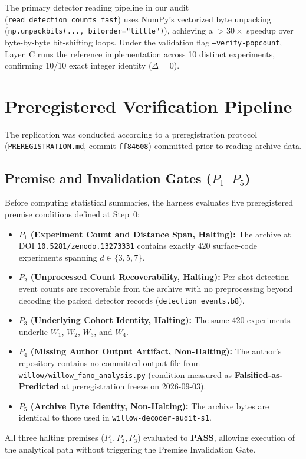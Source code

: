 The primary detector reading pipeline in our audit (\texttt{read\_detection\_counts\_fast}) uses NumPy's vectorized byte unpacking (\texttt{np.unpackbits(..., bitorder="little")}), achieving a $>30\times$ speedup over byte-by-byte bit-shifting loops. Under the validation flag \texttt{--verify-popcount}, Layer~C runs the reference implementation across 10 distinct experiments, confirming 10/10 exact integer identity ($\Delta = 0$).

\section{Preregistered Verification Pipeline}

The replication was conducted according to a preregistration protocol (\texttt{PREREGISTRATION.md}, commit \texttt{ff84608}) committed prior to reading archive data.

\subsection{Premise and Invalidation Gates ($P_1$–$P_5$)}
Before computing statistical summaries, the harness evaluates five preregistered premise conditions defined at Step~0:
\begin{itemize}
    \item \textbf{$P_1$ (Experiment Count and Distance Span, Halting):} The archive at DOI \texttt{10.5281/zenodo.13273331} contains exactly 420 surface-code experiments spanning $d \in \{3, 5, 7\}$.
    \item \textbf{$P_2$ (Unprocessed Count Recoverability, Halting):} Per-shot detection-event counts are recoverable from the archive with no preprocessing beyond decoding the packed detector records (\texttt{detection\_events.b8}).
    \item \textbf{$P_3$ (Underlying Cohort Identity, Halting):} The same 420 experiments underlie $W_1$, $W_2$, $W_3$, and $W_4$.
    \item \textbf{$P_4$ (Missing Author Output Artifact, Non-Halting):} The author's repository contains no committed output file from \texttt{willow/willow\_fano\_analysis.py} (condition measured as \textbf{Falsified-as-Predicted} at preregistration freeze on 2026-09-03).
    \item \textbf{$P_5$ (Archive Byte Identity, Non-Halting):} The archive bytes are identical to those used in \texttt{willow-decoder-audit-s1}.
\end{itemize}
All three halting premises ($P_1, P_2, P_3$) evaluated to \textbf{PASS}, allowing execution of the analytical path without triggering the Premise Invalidation Gate.

